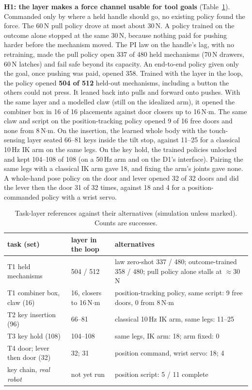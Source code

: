 \documentclass[conference]{IEEEtran}
\newcommand{\hyp}[1]{\textbf{H#1}}
\begin{document}
\textbf{\hyp{1}: the layer makes a force channel usable for tool goals} (Table~\ref{tab:h1}). Commanded only by where a held handle should go,
no existing policy found the force. The 60\,N pull policy drove at most about 30\,N. A policy trained on the outcome alone
stopped at the same 30\,N, because nothing paid for pushing harder before the mechanism moved. The PI law on the handle's
lag, with no retraining, made the pull policy open 337 of 480 held mechanisms (70\,N drawers, 60\,N latches) and fail safe
beyond its capacity. An end-to-end policy given only the goal, once pushing was paid, opened 358. Trained with the layer
in the loop, the policy opened \textbf{504 of 512} held-out mechanisms, including a button the others could not press.
It leaned back into pulls and forward onto pushes. With the same layer and a modelled claw (still on the idealized arm), it opened the combiner box
in 16 of 16 placements against door closers up to 16\,N$\cdot$m. The same claw and script on the position-tracking policy
opened 9 of 16 free doors and none from 8\,N$\cdot$m. On the insertion, the learned whole body with the touch-sensing layer
seated 66--81 keys inside the tilt stop, against 11--25 for a classical 10\,Hz IK arm on the same legs. On the key hold,
the trained policies unlocked and kept 104--108 of 108 (on a 50\,Hz arm and on the D1's interface). Pairing the same
legs with a classical IK arm gave 18, and fixing the arm's joints gave none. A whole-hand pose policy on the door and lever opened 32 of 32 doors and did the lever then the door
31 of 32 times, against 18 and 4 for a position-commanded policy with a wrist servo.

\begin{table}[t]
\centering
\caption{Task-layer references against their alternatives (simulation unless marked). Counts are successes.}
\label{tab:h1}
\footnotesize
\setlength{\tabcolsep}{2.5pt}
\begin{tabular}{@{}p{}p{}p{}@{}}
\toprule
task (set) & layer in the loop & alternatives \\
\midrule
T1 held mechanisms & 504 / 512 & law zero-shot 337 / 480; outcome-trained 358 / 480; pull policy alone stalls at $\approx$30\,N \\
T1 combiner box, claw (16) & 16, closers to 16\,N$\cdot$m & position-tracking policy, same script: 9 free doors, 0 from 8\,N$\cdot$m \\
T2 key insertion (96) & 66--81 & classical 10\,Hz IK arm, same legs: 11--25 \\
T3 key hold (108) & 104--108 & same legs, IK arm: 18; arm fixed: 0 \\
T4 door; lever then door (32) & 32; 31 & position command, wrist servo: 18; 4 \\
\midrule
key chain, \emph{real robot} & not yet run & position script: 5 / 11 complete \\
\bottomrule
\end{tabular}
\end{table}
\end{document}
